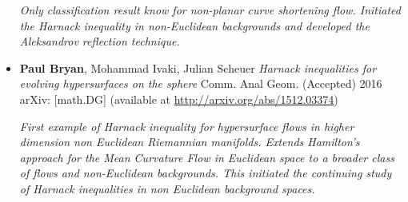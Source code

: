 \documentclass[12pt]{article}
\begin{document}
\begin{itemize}
\emph{Only classification result know for non-planar curve shortening flow. Initiated the Harnack inequality in non-Euclidean backgrounds and developed the Aleksandrov reflection technique.}

\item \textbf{Paul Bryan}, Mohammad Ivaki, Julian Scheuer \emph{Harnack inequalities for evolving hypersurfaces on the sphere} Comm. Anal Geom. (Accepted) 2016 arXiv: [math.DG] (available at \url{http://arxiv.org/abs/1512.03374})

\emph{First example of Harnack inequality for hypersurface flows in higher dimension non Euclidean Riemannian manifolds. Extends Hamilton's approach for the Mean Curvature Flow in Euclidean space to a broader class of flows and non-Euclidean backgrounds. This initiated the continuing study of Harnack inequalities in non Euclidean background spaces.}
\end{itemize}
\end{document}
